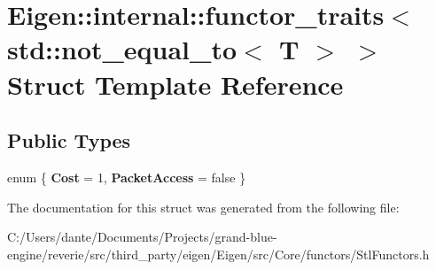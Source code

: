 \hypertarget{struct_eigen_1_1internal_1_1functor__traits_3_01std_1_1not__equal__to_3_01_t_01_4_01_4}{}\section{Eigen\+::internal\+::functor\+\_\+traits$<$ std\+::not\+\_\+equal\+\_\+to$<$ T $>$ $>$ Struct Template Reference}
\label{struct_eigen_1_1internal_1_1functor__traits_3_01std_1_1not__equal__to_3_01_t_01_4_01_4}
\subsection*{Public Types}
\begin{DoxyCompactItemize}
\item 
\mbox{\label{struct_eigen_1_1internal_1_1functor__traits_3_01std_1_1not__equal__to_3_01_t_01_4_01_4_ae8a8c031b1ba106d34f8fbffb241245f}} 
enum \{ {\bfseries Cost} = 1, 
{\bfseries Packet\+Access} = false
 \}
\end{DoxyCompactItemize}


The documentation for this struct was generated from the following file\+:\begin{DoxyCompactItemize}
\item 
C\+:/\+Users/dante/\+Documents/\+Projects/grand-\/blue-\/engine/reverie/src/third\+\_\+party/eigen/\+Eigen/src/\+Core/functors/Stl\+Functors.\+h\end{DoxyCompactItemize}

